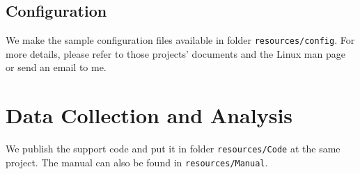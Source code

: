 \documentclass[conference]{IEEEtran}
\begin{document}
\subsection{Configuration}\label{sec:config}
We make the sample configuration files available in folder \texttt{resources/config}. For more details, please refer to those projects' documents and the Linux man page or send an email to me.

\appendix
\section{Data Collection and Analysis}
We publish the support code and put it in folder \texttt{resources/Code} at the same project. The manual can also be found in \texttt{resources/Manual}.
\end{document}
